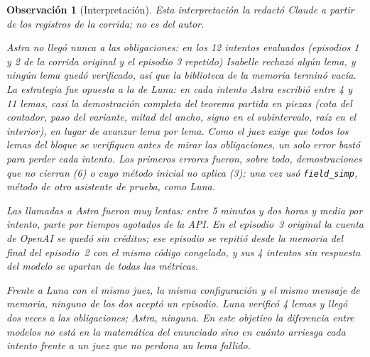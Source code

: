 \documentclass[11pt,a4paper]{article}
\newtheorem{remark}{Observación}
\begin{document}
\begin{remark}[Interpretación]
Esta interpretación la redactó Claude a partir de los registros de la corrida; no es del autor.

Astra no llegó nunca a las obligaciones: en los 12 intentos evaluados (episodios 1 y 2 de la corrida original y el episodio 3 repetido) Isabelle rechazó algún lema, y ningún lema quedó verificado, así que la biblioteca de la memoria terminó vacía. La estrategia fue opuesta a la de Luna: en cada intento Astra escribió entre 4 y 11 lemas, casi la demostración completa del teorema partida en piezas (cota del contador, paso del variante, mitad del ancho, signo en el subintervalo, raíz en el interior), en lugar de avanzar lema por lema. Como el juez exige que todos los lemas del bloque se verifiquen antes de mirar las obligaciones, un solo error bastó para perder cada intento. Los primeros errores fueron, sobre todo, demostraciones que no cierran (6) o cuyo método inicial no aplica (3); una vez usó \texttt{field\_simp}, método de otro asistente de prueba, como Luna.

Las llamadas a Astra fueron muy lentas: entre 5 minutos y dos horas y media por intento, parte por tiempos agotados de la API. En el episodio~3 original la cuenta de OpenAI se quedó sin créditos; ese episodio se repitió desde la memoria del final del episodio~2 con el mismo código congelado, y sus 4 intentos sin respuesta del modelo se apartan de todas las métricas.

Frente a Luna con el mismo juez, la misma configuración y el mismo mensaje de memoria, ninguno de los dos aceptó un episodio. Luna verificó 4 lemas y llegó dos veces a las obligaciones; Astra, ninguna. En este objetivo la diferencia entre modelos no está en la matemática del enunciado sino en cuánto arriesga cada intento frente a un juez que no perdona un lema fallido.
\end{remark}


\end{document}
